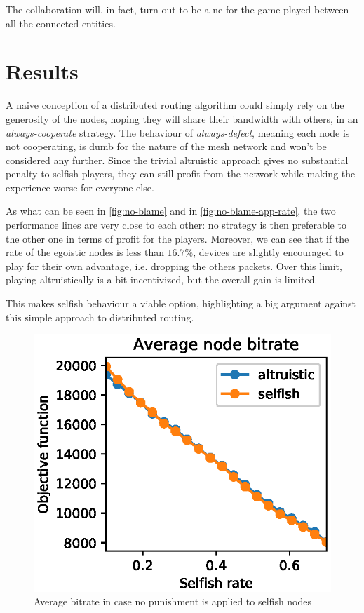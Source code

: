 \documentclass[conference,10.5pt]{IEEEtran}
\begin{document}
The collaboration will, in fact, turn out to be a \gls{ne} for the game played between all the connected entities.

\section{Results} \label{sec:results}


A naive conception of a distributed routing algorithm could simply rely on the generosity of the nodes, hoping they will share their bandwidth with others, in an \emph{always-cooperate} strategy. The behaviour of \emph{always-defect}, meaning each node is not cooperating, is dumb for the nature of the mesh network and won't be considered any further.
Since the trivial altruistic approach gives no substantial penalty to selfish players, they can still profit from the network while making the experience worse for everyone else.

As what can be seen in \autoref{fig:no-blame} and in \autoref{fig:no-blame-app-rate}, the two performance lines are very close to each other: no strategy is then  preferable to the other one in terms of profit for the players. Moreover, we can see that if the rate of the egoistic nodes is less than $16.7\%$, devices are slightly encouraged to play for their own advantage, i.e. dropping the others packets.
Over this limit, playing altruistically is a bit incentivized, but the overall gain is limited.

This makes selfish behaviour a viable option, highlighting a big argument against this simple approach to distributed routing.

\smallbreak
\smallbreak

\begin{figure}[h]
  \includegraphics{figures/obj_func_vs_selfish_rate_no_punish.eps}
  \caption{Average bitrate in case no punishment is applied to selfish nodes}
  \label{fig:no-blame}
\end{figure}
\end{document}
